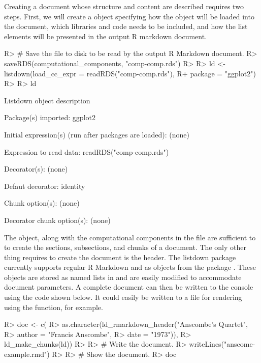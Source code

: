 \documentclass[
]{jss}
\begin{document}
Creating a document whose structure and content are described
 requires two steps. First, we will
create a  object specifying how the \newline
{} object will be loaded into the document,
which libraries and code needs to be included, and how the list elements
will be presented in the output R markdown document.

\begin{CodeChunk}

\begin{CodeInput}
R> # Save the file to disk to be read by the output R Markdown document.
R> saveRDS(computational_components, "comp-comp.rds")
R> 
R> ld <- listdown(load_cc_expr = readRDS("comp-comp.rds"),
R+                package = "ggplot2")
R> 
R> ld
\end{CodeInput}

\begin{CodeOutput}

Listdown object description

Package(s) imported:
    ggplot2

Initial expression(s) (run after packages are loaded):
    (none)

Expression to read data:
    readRDS("comp-comp.rds")

Decorator(s):
    (none)

Defaut decorator:
    identity

Chunk option(s):
    (none)

Decorator chunk option(s):
    (none)
\end{CodeOutput}
\end{CodeChunk}

The  object, along with the computational components in the
 file are sufficient to to create the sections,
subsections, and  chunks of a document. The only other thing
requires to create the document is the header. The listdown package
currently supports regular R Markdown and  as 
objects from the  package \citep{yaml}. These objects are
stored as named lists in  and are easily modified to
accommodate document parameters. A complete document can then be written
to the console using the code shown below. It could easily be written to
a file for rendering using the  function, for
example.

\begin{CodeChunk}

\begin{CodeInput}
R> doc <- c(
R>   as.character(ld_rmarkdown_header("Anscombe's Quartet",
R>                                    author = "Francis Anscombe",
R>                                    date = "1973")),
R>   ld_make_chunks(ld))
R> 
R> # Write the document.
R> writeLines("anscome-example.rmd")
R> 
R> # Show the document.
R> doc
\end{CodeInput}
\end{CodeChunk}
\end{document}
